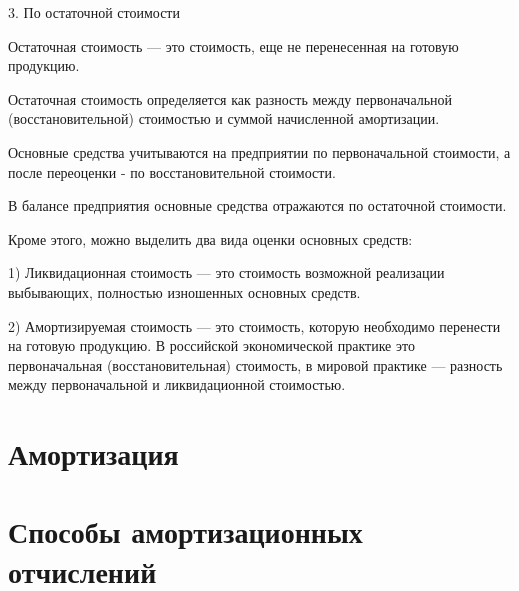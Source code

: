 3. По остаточной стоимости

Остаточная стоимость --- это стоимость, еще не перенесенная на готовую
продукцию.

Остаточная стоимость определяется как разность между первоначальной
(восстановительной) стоимостью и суммой начисленной амортизации.

Основные средства учитываются на предприятии по первоначальной стоимости, а
после переоценки - по восстановительной стоимости.

В балансе предприятия основные средства отражаются по остаточной стоимости.

Кроме этого, можно выделить два вида оценки основных средств:

1) Ликвидационная стоимость --- это стоимость возможной реализации выбывающих,
полностью изношенных основных средств.

2) Амортизируемая стоимость --- это стоимость, которую необходимо перенести на
готовую продукцию. В российской экономической практике это первоначальная
(восстановительная) стоимость, в мировой практике --- разность между
первоначальной и ликвидационной стоимостью.

\section{Амортизация}

\section{Способы амортизационных отчислений}
